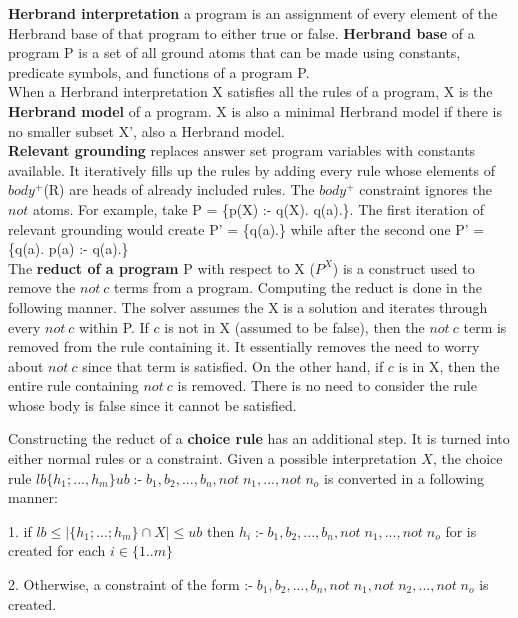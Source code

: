 \textbf{Herbrand interpretation} a program is an assignment of every element of the Herbrand base of that program to either true or false. \textbf{Herbrand base} of a program P is a set of all ground atoms that can be made using constants, predicate symbols, and functions of a program P.\\

When a Herbrand interpretation X satisfies all the rules of a program, X is the \textbf{Herbrand model} of a program. X is also a minimal Herbrand model if there is no smaller subset X', also a Herbrand model.\\

\textbf{Relevant grounding} replaces answer set program variables with constants available.
It iteratively fills up the rules by adding every rule whose elements of $body^+$(R) are heads of already included rules. 
The $body^+$ constraint ignores the $not$ atoms. 
For example, take P = \{p(X) :- q(X). q(a).\}. 
The first iteration of relevant grounding would create P' = \{q(a).\} while after the second one P' = \{q(a). p(a) :- q(a).\}\\

The \textbf{reduct of a program} P with respect to X ($P^X$) is a construct used to remove the $not\: c$ terms from a program.
Computing the reduct is done in the following manner. The solver assumes the X is a solution and iterates through every $not\: c$ within P. 
If $c$ is not in X (assumed to be false), then the $not\: c$ term is removed from the rule containing it. 
It essentially removes the need to worry about $not\: c$ since that term is satisfied.
On the other hand, if $c$ is in X, then the entire rule containing $not\: c$ is removed.
There is no need to consider the rule whose body is false since it cannot be satisfied.

Constructing the reduct of a \textbf{choice rule} has an additional step.
It is turned into either normal rules or a constraint.
Given a possible interpretation $X$, the choice rule $lb\{h_1; ..., h_m\}ub\; \text{:-} \;  b_1, b_2, ..., b_n, not\; n_1, ..., not\; n_o$ is converted in a following manner:

1. if $ lb \leq |\{h_1; ...; h_m\} \cap X| \leq ub$ then $h_i \; \text{:-} \;  b_1, b_2, ..., b_n, not\; n_1, ..., not\; n_o$ for is created for each $i \in \{1..m\}$

2. Otherwise, a constraint of the form $ \text{:-} \;  b_1, b_2, ..., b_n, not\; n_1, not\; n_2, ..., not\; n_o$ 
is created.\\

